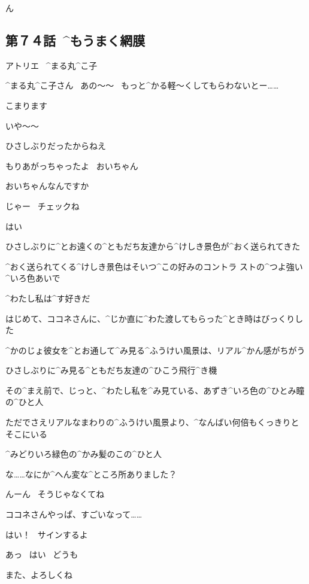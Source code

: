 \page[118]
\Alpha ん


\subsection{第７４話\ ^{もうまく}{網膜}}

\page[120]
\Sign アトリエ
\ ^{まる}{丸}^{こ}{子}

\page[123]
\Kokone ^{まる}{丸}^{こ}{子}さん
\ あの〜〜
\ もっと^{かる}{軽}〜くしてもらわないとー……

\Kokone こまります

\Maruko いや〜〜

\Maruko ひさしぶりだったからねえ

\Maruko もりあがっちゃったよ
\ おいちゃん

\Kokone おいちゃんなんですか

\page[124]
\Maruko じゃー
\ チェックね

\Kokone はい

\Maruko ひさしぶりに^{とお}{遠}くの^{ともだち}{友達}から^{けしき}{景色}が^{おく}{送}られてきた

\Maruko ^{おく}{送}られてくる^{けしき}{景色}はそいつ^{この}{好}みのコントラ
ストの^{つよ}{強}い^{いろ}{色}あいで

\Maruko ^{わたし}{私}は^{す}{好}きだ

\Maruko はじめて、ココネさんに、^{じか}{直}に^{わた}{渡}してもらった^{とき}{時}はびっくりした

\Maruko ^{かのじょ}{彼女}を^{とお}{通}して^{み}{見}る^{ふうけい}{風景}は、リアル^{かん}{感}がちがう

\page[127]
\Maruko ひさしぶりに^{み}{見}る^{ともだち}{友達}の^{ひこう}{飛行}^{き}{機}

\Maruko その^{まえ}{前}で、じっと、^{わたし}{私}を^{み}{見}ている、あずき^{いろ}{色}の^{ひとみ}{瞳}の^{ひと}{人}

\Maruko ただでさえリアルなまわりの^{ふうけい}{風景}より、^{なんばい}{何倍}もくっきりとそこにいる

\Maruko ^{みどりいろ}{緑色}の^{かみ}{髪}のこの^{ひと}{人}

\page[128]
\Kokone な……なにか^{へん}{変}な^{ところ}{所}ありました？

\Maruko んーん
\ そうじゃなくてね

\Maruko ココネさんやっぱ、すごいなって……

\Maruko はい！
\ サインするよ

\Kokone あっ
\ はい
\ どうも

\page[129]
\Maruko また、よろしくね

